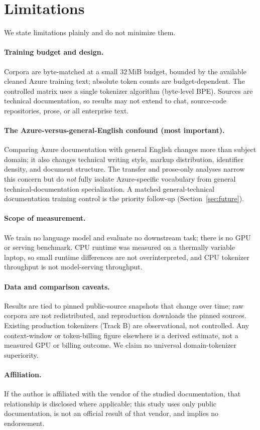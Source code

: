 \section{Limitations}
\label{sec:limits}

We state limitations plainly and do not minimize them.

\paragraph{Training budget and design.} Corpora are byte-matched at a small
$32$\,MiB budget, bounded by the available cleaned Azure training text; absolute
token counts are budget-dependent. The controlled matrix uses a single tokenizer
algorithm (byte-level BPE). Sources are technical documentation, so results may
not extend to chat, source-code repositories, prose, or all enterprise text.

\paragraph{The Azure-versus-general-English confound (most important).} Comparing
Azure documentation with general English changes more than subject domain; it also
changes technical writing style, markup distribution, identifier density, and
document structure. The transfer and prose-only analyses narrow this concern but
do \emph{not} fully isolate Azure-specific vocabulary from general
technical-documentation specialization. A matched general-technical documentation
training control is the priority follow-up (Section~\ref{sec:future}).

\paragraph{Scope of measurement.} We train no language model and evaluate no
downstream task; there is no GPU or serving benchmark. CPU runtime was measured on
a thermally variable laptop, so small runtime differences are not overinterpreted,
and CPU tokenizer throughput is not model-serving throughput.

\paragraph{Data and comparison caveats.} Results are tied to pinned public-source
snapshots that change over time; raw corpora are not redistributed, and
reproduction downloads the pinned sources. Existing production tokenizers (Track
B) are observational, not controlled. Any context-window or token-billing figure
elsewhere is a derived estimate, not a measured GPU or billing outcome. We claim
no universal domain-tokenizer superiority.

\paragraph{Affiliation.} If the author is affiliated with the vendor of the studied
documentation, that relationship is disclosed where applicable; this study uses
only public documentation, is not an official result of that vendor, and implies
no endorsement.
